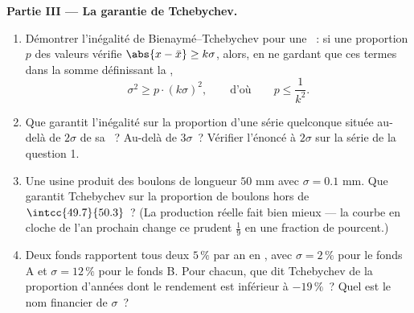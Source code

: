 \begin{problem}
\medskip
\noindent\textbf{Partie III --- La garantie de Tchebychev.}
\begin{enumerate}[resume]
  \item Démontrer l'inégalité de Bienaymé--Tchebychev pour une
        ~: si une proportion $p$ des valeurs
        vérifie $\abs{x - \bar x} \geq k\sigma$, alors, en ne
        gardant que ces termes dans la somme définissant la
        ,
        \[
        \sigma^2 \geq p \cdot (k\sigma)^2,
        \qquad\text{d'où}\qquad
        p \leq \frac{1}{k^2} .
        \]
  \item Que garantit l'inégalité sur la proportion d'une série
        quelconque située au-delà de $2\sigma$ de sa ~?
        Au-delà de $3\sigma$~? Vérifier l'énoncé à $2\sigma$ sur la
        série de la question 1.
  \item Une usine produit des boulons de longueur  $50$ mm
        avec $\sigma = 0.1$ mm. Que garantit Tchebychev sur la
        proportion de boulons hors de $\intcc{49.7}{50.3}$~? (La
        production réelle fait bien mieux --- la courbe en cloche de
        l'an prochain change ce prudent $\frac19$ en une fraction de
        pourcent.)
  \item Deux fonds rapportent tous deux $5\,\%$ par an en ,
        avec $\sigma = 2\,\%$ pour le fonds A et $\sigma = 12\,\%$
        pour le fonds B. Pour chacun, que dit Tchebychev de la
        proportion d'années dont le rendement est inférieur à
        $-19\,\%$~? Quel est le nom financier de $\sigma$~?
\end{enumerate}


\end{problem}
